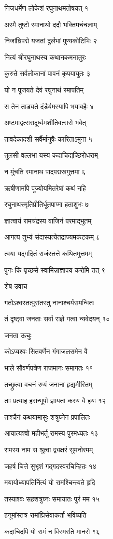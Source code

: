 निजधर्मेण लोकेशं रघुनाथमतोषयत् १

अस्मै तुष्टो रमानाथो ददौ भक्तिमचंचलाम्

निजांघ्रिपद्मे यजतां दुर्लभां पुण्यकोटिभिः २

नित्यं श्रीरघुनाथस्य कथानकमनातुरः

कुरुते सर्वलोकानां पावनं कृपयायुतः ३

यो न पूजयते देवं रघुनाथं रमापतिम्

स तेन ताड्यते दंडैर्यमस्यापि भयावहैः ४

अष्टमाद्वत्सरादूर्ध्वमशीतिवत्सरो भवेत्

तावदेकादशी सर्वैर्मानुषैः कारिताऽमुना ५

तुलसी वल्लभा यस्य कदाचिद्यच्छिरोधराम्

न मुंचति रमानाथ पादपद्मस्रगुत्तमा ६

ऋषीणामपि पूज्योयमितरेषां कथं नहि

रघुनाथस्मृतिप्रीतिर्धूतपाप्मा हताशुभः ७

ज्ञात्वायं रामचंद्रस्य वाजिनं परमाद्भुतम्

आगत्य तुभ्यं संदास्यत्येतद्राज्यमकंटकम् ८

त्वया यद्गदितं राजंस्तत्ते कथितमुत्तमम्

पुनः किं पृच्छसे स्वामिन्नाज्ञापय करोमि तत् ९

शेष उवाच

गतोऽश्वस्तत्पुरांतस्तु नानाश्चर्यसमन्वितः

तं दृष्ट्वा जनताः सर्वा राज्ञे गत्वा न्यवेदयन् १०

जनता ऊचुः

कोऽप्यश्वः सितवर्णेन गंगाजलसमेन वै

भाले सौवर्णपत्रेण राजमानः समागतः ११

तच्छ्रुत्वा वचनं रम्यं जनानां हृद्यमीरितम्

ताः प्रत्याह हसन्भूपो ज्ञायतां कस्य वै हयः १२

ताश्चैनं कथयामासुः शत्रुघ्नेन प्रपालितः

आयात्यश्वो महीभर्तू रामस्य पुरमध्यतः १३

रामस्य नाम स श्रुत्वा द्व्यक्षरं सुमनोरमम्

जहर्ष चित्ते सुभृशं गद्गदस्वरचिन्हितः १४

मयायोध्यापतिर्नित्यं यो रामश्चिन्त्यते हृदि

तस्याश्वः सहशत्रुघ्नः समायातः पुरं मम १५

हनूमांस्तत्र रामांघ्रिसेवाकर्ता भविष्यति

कदाचिदपि यो रामं न विस्मरति मानसे १६

